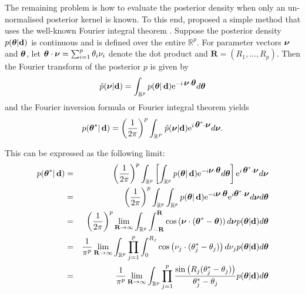 \documentclass[%
 reprint,
 amsmath,amssymb,
 aps,
]{revtex4-2}
\def\R{\mathbb{R}}
\def\Rbold{\mathbf{R}}
\renewcommand{\d}{{\bf d}}
\newcommand{\btheta}{\mbox{\boldmath $\theta$}}
\newcommand{\bnu}{\mbox{\boldmath $\nu$}}
\newcommand{\e}{{\rm e}}
\begin{document}
The remaining problem is how to evaluate the posterior density when only an un-normalised posterior kernel is known. To this end, \cite{rotiroti2022computing} proposed a simple method that uses the well-known  Fourier integral theorem \cite{pristley2005introduction}. Suppose the posterior density $p(\btheta|\d)$ is continuous and is defined over the entire $\R^p$.  For parameter vectors $\bnu$
and $\btheta$, let $\btheta\cdot\bnu=\sum_{i=1}^p \theta_i\nu_i$ denote the dot product and $\Rbold=(R_1,\ldots,R_p)$. Then the Fourier transform of the posterior $p$ is given by
\[
 \tilde{p}(\bnu|\d)=\int_{\R^p} p(\btheta|\,\d) \e^{-i\,\bnu\cdot\btheta} d\btheta
\]
and the Fourier inversion formula or Fourier integral theorem yields
\[p(\btheta^*|\,\d)= \left(\frac{1}{2\pi}\right)^p \int_{\R^P} \tilde{p}(\bnu|\d)\e^{i\,\btheta^*\cdot\bnu} d\bnu.\]


This can be expressed as the following limit:
\begin{eqnarray*}
p(\btheta^*|\,\d) &=& \left(\frac{1}{2\pi}\right)^p   \int_{\R^p} \left[ \int_{\R^p} p(\btheta|\,\d) \e^{-i \bnu \cdot \btheta} d\btheta\right]
 \e^{i\,\btheta^*\cdot\bnu} d\bnu\\
 &=& \left(\frac{1}{2\pi}\right)^p     \int_{\R^p}  \int_{\R^p} p(\btheta|\,\d) \e^{-i \bnu \cdot \btheta}
 \e^{i\btheta^*\cdot\bnu} d\bnu d\btheta\\
 &=& \left(\frac{1}{2\pi}\right)^p    \lim_{\Rbold\rightarrow \infty} \int_{\R^p}  \int_{-\Rbold}^{\Rbold} \cos\left(\bnu\cdot(\btheta^*-\btheta) \right)d\bnu p(\btheta|\d)   d\btheta\\
 &=& \frac{1}{\pi^p}   \lim_{\Rbold\rightarrow \infty} \int_{\R^p}  \prod_{j=1}^p \int_{0}^{R_j} \cos\left(\nu_j\cdot(\theta_j^*-\theta_j) \right)d\nu_j p(\btheta|\d)   d\btheta\\
 &=& \frac{1}{\pi^p}  \lim_{\Rbold\rightarrow \infty} \int_{\R^p}   \prod_{j=1}^p \frac{\sin\left(R_j(\theta_j^*-\theta_j) \right)}{\theta_j^*-\theta_j} p(\btheta|\d)   d\btheta
\end{eqnarray*}
\end{document}
